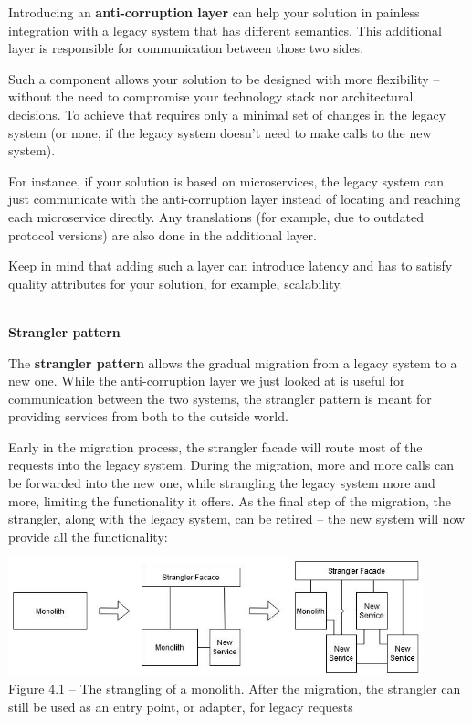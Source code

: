 Introducing an \textbf{anti-corruption layer} can help your solution in painless integration with a legacy system that has different semantics. This additional layer is responsible for communication between those two sides.

Such a component allows your solution to be designed with more flexibility – without the need to compromise your technology stack nor architectural decisions. To achieve that requires only a minimal set of changes in the legacy system (or none, if the legacy system doesn't need to make calls to the new system).

For instance, if your solution is based on microservices, the legacy system can just communicate with the anti-corruption layer instead of locating and reaching each microservice directly. Any translations (for example, due to outdated protocol versions) are also done in the additional layer.

Keep in mind that adding such a layer can introduce latency and has to satisfy quality attributes for your solution, for example, scalability.


\hspace*{\fill} \\ %
\noindent
\textbf{Strangler pattern}

The \textbf{strangler pattern} allows the gradual migration from a legacy system to a new one. While the anti-corruption layer we just looked at is useful for communication between the two systems, the strangler pattern is meant for providing services from both to the outside world.

Early in the migration process, the strangler facade will route most of the requests into the legacy system. During the migration, more and more calls can be forwarded into the new one, while strangling the legacy system more and more, limiting the functionality it offers. As the final step of the migration, the strangler, along with the legacy system, can be retired – the new system will now provide all the functionality:

\begin{center}
\includegraphics[width=0.9\textwidth]{content/2/chapter4/images/1.jpg}\\
Figure 4.1 – The strangling of a monolith. After the migration, the strangler can still be used as an entry point, or adapter, for legacy requests
\end{center}

